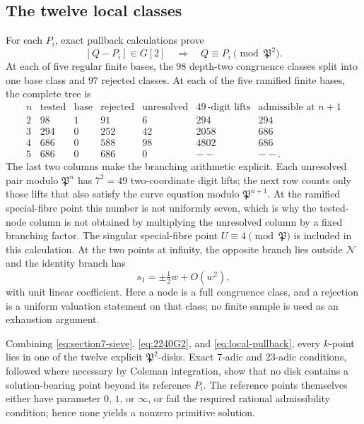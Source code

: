 \documentclass[11pt]{article}
\newcommand{\PP}{\mathfrak P}
\theoremstyle{definition}
\theoremstyle{remark}
\begin{document}
\subsection{The twelve local classes}\label{subsec:twelve-local}

For each $P_i$, exact pullback calculations prove
\begin{equation}\label{eq:local-pullback}
 [Q-P_i]\in G[2]\quad\Longrightarrow\quad
                         Q\equiv P_i\pmod{\PP^2}.
\end{equation}
At each of five regular finite bases, the $98$ depth-two congruence classes
split into one base class and $97$ rejected classes.  At each of the five
ramified finite bases, the complete tree is
\[
\begin{array}{c|rrrr|rr}
n&\text{tested}&\text{base}&\text{rejected}&\text{unresolved}
 &49\,\text{-digit lifts}&\text{admissible at }n+1\\ \hline
2&98 &1&91 &6  &294 &294\\
3&294&0&252&42 &2058&686\\
4&686&0&588&98 &4802&686\\
5&686&0&686&0  &--&--.
\end{array}
\]
The last two columns make the branching arithmetic explicit.  Each
unresolved pair modulo $\PP^n$ has $7^2=49$ two-coordinate digit lifts;
the next row counts only those lifts that also satisfy the curve equation
modulo $\PP^{n+1}$.  At the ramified special-fibre point this number is not
uniformly seven, which is why the tested-node column is not obtained by
multiplying the unresolved column by a fixed branching factor.
The singular special-fibre point $U\equiv4\pmod{\PP}$ is included in this
calculation.  At the two points at infinity, the opposite branch lies
outside $\mathcal N$ and the identity branch has
\[
                            s_1=\pm\tfrac12w+O(w^2),
\]
with unit linear coefficient.  Here a node is a full congruence class, and a
rejection is a uniform valuation statement on that class; no finite sample
is used as an exhaustion argument.

Combining \eqref{eq:section7-sieve}, \eqref{eq:2240G2}, and
\eqref{eq:local-pullback}, every $k$-point lies in one of the twelve
explicit $\PP^2$-disks.  Exact $7$-adic and $23$-adic conditions, followed
where necessary by Coleman integration, show that no disk contains a
solution-bearing point beyond its reference $P_i$.  The reference points
themselves either have parameter $0$, $1$, or $\infty$, or fail the required
rational admissibility condition; hence none yields a nonzero primitive
solution.
\end{document}
